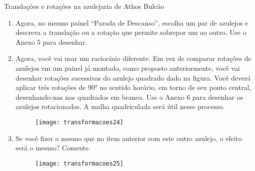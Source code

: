 \begin{task}{Translações e rotações na azulejaria de Athos Bulcão}
\begin{enumerate}
\begin{multicols}{2}
\begin{itemize}
\begin{figure}[H]
\texttt{[image: transformacoes23]}
\end{figure}
\end{itemize}
\end{multicols}

\item Agora, no mesmo painel “Parada de Descanso”, escolha um par de azulejos e descreva a translação ou a rotação que permite sobrepor um ao outro. Use o Anexo 5 para desenhar. 


\item Agora, você vai usar um raciocínio diferente. Em vez de comparar rotações de azulejos em um painel já montado, como proposto anteriormente, você vai desenhar rotações sucessivas do azulejo quadrado dado na figura. Você deverá aplicar três rotações de 90° no sentido horário, em torno de seu ponto central, desenhando-nas nos quadrados em branco. Use o Anexo 6 para desenhar os azulejos rotacionados. A malha quadriculada será útil nesse processo.

\begin{figure}[H]
\centering

\texttt{[image: transformacoes24]}
\end{figure}

\item Se você fizer o mesmo que no item anterior com este outro azulejo, o efeito será o mesmo? Comente.

\begin{figure}[H]
\centering

\texttt{[image: transformacoes25]}
\end{figure}
\end{enumerate}

\end{task}

